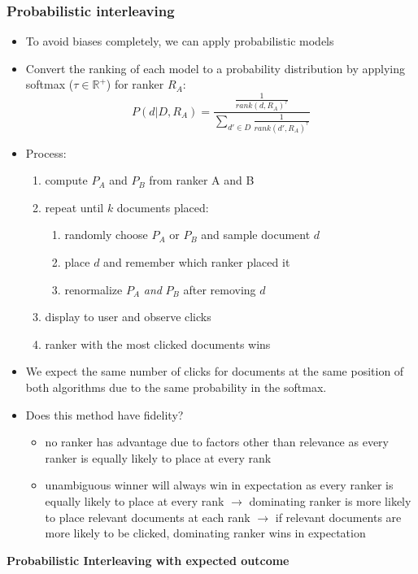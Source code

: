 \subsubsection{Probabilistic interleaving}
\begin{itemize}
	\item To avoid biases completely, we can apply probabilistic models
	\item Convert the ranking of each model to a probability distribution by applying softmax ($\tau \in \mathbb{R}^+$) for ranker $R_A$:
	$$P(d|D,R_A) = \frac{\frac{1}{rank(d,R_A)^{\tau}}}{\sum_{d' \in D} \frac{1}{rank(d',R_A)^{\tau}}}$$
	\item Process:
	\begin{enumerate}
		\item compute $P_A$ and $P_B$ from ranker A and B
		\item repeat until $k$ documents placed:
		\begin{enumerate}
			\item randomly choose $P_A$ or $P_B$ and sample document $d$
			\item place $d$ and remember which ranker placed it
			\item renormalize $P_A$ \textit{and} $P_B$ after removing $d$
		\end{enumerate}
		\item display to user and observe clicks
		\item ranker with the most clicked documents wins
	\end{enumerate}
	\item We expect the same number of clicks for documents at the same position of both algorithms due to the same probability in the softmax.
	\item Does this method have fidelity?
	\begin{itemize}
		\item no ranker has advantage due to factors other than relevance as every ranker is equally likely to place at every rank
		\item unambiguous winner will always win in expectation as every ranker is equally likely to place at every rank $\rightarrow$ dominating ranker is more likely to place relevant documents at each rank $\rightarrow$ if relevant documents are more likely to be clicked, dominating ranker wins in expectation
	\end{itemize}
\end{itemize}
\textbf{Probabilistic Interleaving with expected outcome}

